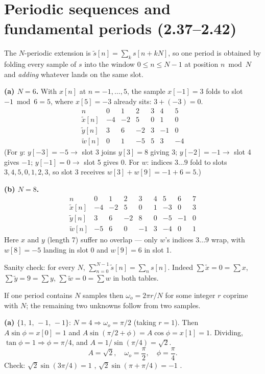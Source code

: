 \section{Periodic sequences and fundamental periods (2.37--2.42)}


The $N$-periodic extension is
$\tilde{s}[n]=\sum_{k}s[n+kN]$, so one period is obtained by folding every sample of $s$ into
the window $0\le n\le N-1$ at position $n\bmod N$ and \emph{adding} whatever lands on the
same slot.

\textbf{(a) $N=6$.} With $x[n]$ at $n=-1,\dots,5$, the sample $x[-1]=3$ folds to slot
$-1\bmod 6=5$, where $x[5]=-3$ already sits: $3+(-3)=0$.
\[
\begin{array}{r|rrrrrr}
n & 0&1&2&3&4&5\\\hline
\tilde{x}[n] & -4&-2&5&0&1&0\\
\tilde{y}[n] & 3&6&-2&3&-1&0\\
\tilde{w}[n] & 0&1&-5&5&3&-4
\end{array}
\]
(For $y$: $y[-3]=-5\to$ slot 3 joins $y[3]=8$ giving $3$; $y[-2]=-1\to$ slot 4 gives $-1$;
$y[-1]=0\to$ slot 5 gives $0$. For $w$: indices $3\dots9$ fold to slots $3,4,5,0,1,2,3$, so
slot 3 receives $w[3]+w[9]=-1+6=5$.)

\textbf{(b) $N=8$.}
\[
\begin{array}{r|rrrrrrrr}
n & 0&1&2&3&4&5&6&7\\\hline
\tilde{x}[n] & -4&-2&5&0&1&-3&0&3\\
\tilde{y}[n] & 3&6&-2&8&0&-5&-1&0\\
\tilde{w}[n] & -5&6&0&-1&3&-4&0&1
\end{array}
\]
Here $x$ and $y$ (length 7) suffer no overlap --- only $w$'s indices $3\dots 9$ wrap, with
$w[8]=-5$ landing in slot 0 and $w[9]=6$ in slot 1.

Sanity check: for every $N$, $\sum_{n=0}^{N-1}\tilde{s}[n]=\sum_n s[n]$. Indeed
$\sum\tilde x=0=\sum x$, $\sum\tilde y=9=\sum y$, $\sum \tilde w=0=\sum w$ in both tables.


If one period contains $N$ samples then $\omega_o = 2\pi r/N$ for some integer $r$ coprime
with $N$; the remaining two unknowns follow from two samples.

\textbf{(a)} $\{1,\,1,\,-1,\,-1\}$: $N=4\Rightarrow\omega_o=\pi/2$ (taking $r=1$).
Then $A\sin\phi=x[0]=1$ and $A\sin(\pi/2+\phi)=A\cos\phi=x[1]=1$. Dividing,
$\tan\phi=1\Rightarrow\phi=\pi/4$, and $A=1/\sin(\pi/4)=\sqrt2$.
\[
\boxed{\;A=\sqrt{2},\quad \omega_o=\frac{\pi}{2},\quad \phi=\frac{\pi}{4}.\;}
\]
Check: $\sqrt2\sin(3\pi/4)=1$ \checkmark, $\sqrt2\sin(\pi+\pi/4)=-1$ \checkmark.

